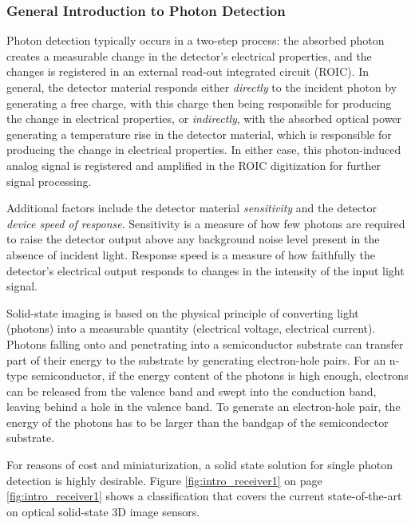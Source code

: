 \subsubsection{General Introduction to Photon Detection}
\label{introReceiver}
Photon detection typically occurs in a two-step process: the absorbed photon creates a measurable change in the detector's electrical properties, and the changes is registered in an external read-out integrated circuit (\acs{ROIC}). In general, the detector material responds either \textit{directly} to the incident photon by generating a free charge, with this charge then being responsible for producing the change in electrical properties, or \textit{indirectly}, with the absorbed optical power generating a temperature rise in the detector material, which is responsible for producing the change in electrical properties. In either case, this photon-induced analog signal is registered and amplified in the \acs{ROIC} digitization for further signal processing. 

Additional factors include the detector material \textit{sensitivity} and the detector \textit{device speed of response}. Sensitivity is a measure of how few photons are required to raise the detector output above any background noise level present in the absence of incident light. Response speed is a measure of how faithfully the detector's electrical output responds to changes in the intensity of the input light signal.

\label{ssphotonsensing}
Solid-state imaging is based on the physical principle of converting light (photons) into a measurable quantity (electrical voltage, electrical current). Photons falling onto and penetrating into a semiconductor substrate can transfer part of their energy to the substrate by generating electron-hole pairs. For an n-type semiconductor, if the energy content of the photons is high enough, electrons can be released from the valence band and swept into the conduction band, leaving behind a hole in the valence band. To generate an electron-hole pair, the energy of the photons has to be larger than the bandgap of the semicondector substrate.

For reasons of cost and miniaturization, a solid state solution for single photon detection is highly desirable. Figure \ref{fig:intro_receiver1} on page \ref{fig:intro_receiver1} shows a classification that covers the current state-of-the-art on optical solid-state 3D image sensors. 

